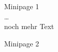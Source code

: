 \begin{minipage}{0.45\textwidth}
Minipage 1\\
\ldots\\
noch mehr Text
\end{minipage}
\begin{minipage}{0.45\textwidth}
Minipage 2
\end{minipage}
